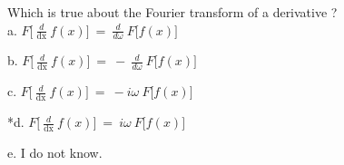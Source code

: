
Which is true about the Fourier transform of a derivative ? \\

a.
\(F\lbrack\ \frac{d}{\text{dx}}\ f(x)\rbrack\  = \ \frac{d}{d\omega}\ F\lbrack f(x)\rbrack\)

b.
\(F\lbrack\ \frac{d}{\text{dx}}\ f(x)\rbrack\  = \  - \ \frac{d}{d\omega}\ F\lbrack f(x)\rbrack\)

c.
\(F\lbrack\ \frac{d}{\text{dx}}\ f(x)\rbrack\  = \  - i\omega\ F\lbrack f(x)\rbrack\)

*d.
\(F\lbrack\ \frac{d}{\text{dx}}\ f(x)\rbrack\  = \ i\omega\ F\lbrack f(x)\rbrack\)

e. I do not know. \\
